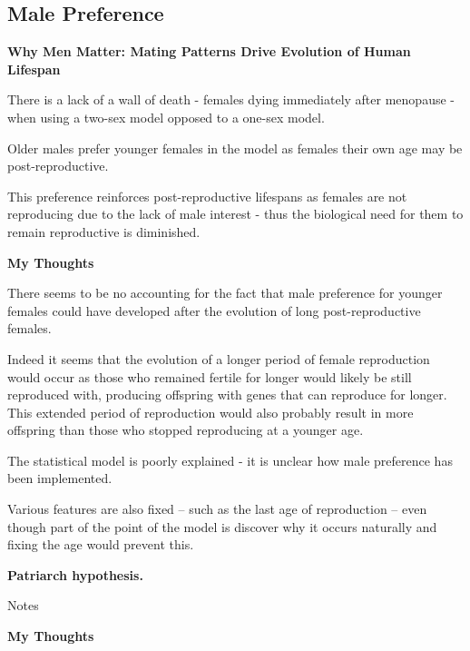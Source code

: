 \documentclass[authoryearcitations]{UoYCSproject}
\begin{document}
\subsection{Male Preference}
\begin{framed}
\noindent \textbf{Why Men Matter: Mating Patterns Drive Evolution of Human Lifespan \cite{whyMenMatter2007}}

There is a lack of a wall of death - females dying immediately after menopause - when using a two-sex model opposed to a one-sex model.

Older males prefer younger females in the model as females their own age may be post-reproductive.

This preference reinforces post-reproductive lifespans as females are not reproducing due to the lack of male interest - thus the biological need for them to remain reproductive is diminished.



\noindent \textbf{My Thoughts}

There seems to be no accounting for the fact that male preference for younger females could have developed after the evolution of long post-reproductive females.

Indeed it seems that the evolution of a longer period of female reproduction would occur as those who remained fertile for longer would likely be still reproduced with, producing offspring with genes that can reproduce for longer. This extended period of reproduction would also probably result in more offspring than those who stopped reproducing at a younger age.

The statistical model is poorly explained - it is unclear how male preference has been implemented.

Various features are also fixed -- such as the last age of reproduction -- even though part of the point of the model is discover why it occurs naturally and fixing the age would prevent this.
\end{framed}

\begin{framed}
\noindent \textbf{Patriarch hypothesis. \cite{patriarchHypothesis2000}}

Notes

\noindent \textbf{My Thoughts}


\end{framed}
\end{document}
